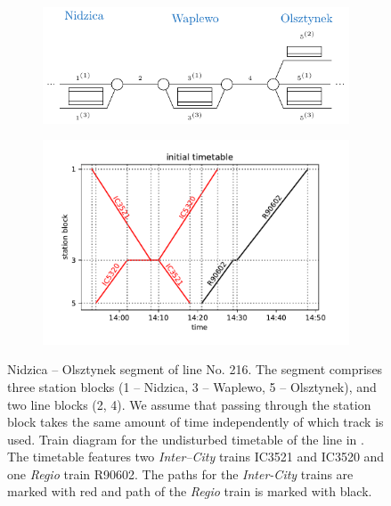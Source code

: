 \begin{figure}
  \begin{subfigure}{\textwidth}
    \caption{}\label{fig:linesmall:line}
    \includegraphics[width=\textwidth]{figures/line_small.pdf}
  \end{subfigure}
  \begin{subfigure}{\textwidth}
    \caption{}\label{fig:linesmall:diagram}
    \includegraphics[width=\textwidth]{figures/train_diagram_small}
  \end{subfigure}
  \caption{ Nidzica -- Olsztynek segment of line No. 216. The segment comprises three
      station blocks (1 -- Nidzica, 3 -- Waplewo, 5 -- Olsztynek), and two line
      blocks (2, 4). We assume that passing through the station block takes the same
      amount of time independently of which track is used.  Train diagram for the undisturbed timetable of the line in . The timetable features two
      \emph{Inter--City} trains IC3521 and IC3520 and one \emph{Regio} train R90602. The paths for the
      \emph{Inter-City} trains are marked with red and path of the \emph{Regio} train is marked with black.}
    \label{fig:linesmall}
\end{figure}

